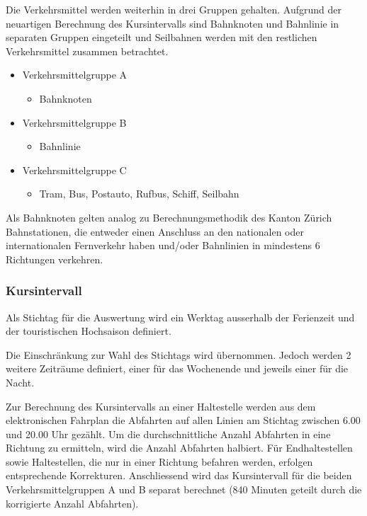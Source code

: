 Die Verkehrsmittel werden weiterhin in drei Gruppen gehalten.
Aufgrund der neuartigen Berechnung des Kursintervalls sind Bahnknoten und Bahnlinie in separaten Gruppen eingeteilt und Seilbahnen werden mit den restlichen Verkehrsmittel zusammen betrachtet.

\begin{itemize}[noitemsep]
    \item Verkehrsmittelgruppe A
    \begin{itemize}
        \item Bahnknoten
    \end{itemize}
    \item Verkehrsmittelgruppe B
    \begin{itemize}
        \item Bahnlinie
    \end{itemize}
    \item Verkehrsmittelgruppe C
    \begin{itemize}
        \item Tram, Bus, Postauto, Rufbus, Schiff, Seilbahn
    \end{itemize}
\end{itemize}

Als Bahnknoten gelten analog zu Berechnungsmethodik des Kanton Zürich Bahnstationen, die entweder einen Anschluss an den nationalen oder internationalen Fernverkehr haben und/oder Bahnlinien in mindestens 6 Richtungen verkehren. 

\subsubsection{Kursintervall}
\label{Zusammenhang zur Berechnungsmethodik ARE:Kursintervall}

\begin{itquote}
Als Stichtag für die Auswertung wird ein Werktag ausserhalb der Ferienzeit und der touristischen Hochsaison definiert.
\end{itquote}

Die Einschränkung zur Wahl des Stichtags wird übernommen.
Jedoch werden 2 weitere Zeiträume definiert, einer für das Wochenende und jeweils einer für die Nacht.

\begin{itquote}
Zur Berechnung des Kursintervalls an einer Haltestelle werden aus dem elektronischen Fahrplan die Abfahrten auf allen Linien am Stichtag zwischen 6.00 und 20.00 Uhr gezählt.
Um die durchschnittliche Anzahl Abfahrten in eine Richtung zu ermitteln, wird die Anzahl Abfahrten halbiert.
Für Endhaltestellen sowie Haltestellen, die nur in einer Richtung befahren werden, erfolgen entsprechende Korrekturen.
Anschliessend wird das Kursintervall für die beiden Verkehrsmittelgruppen A und B separat berechnet (840 Minuten geteilt durch die korrigierte Anzahl Abfahrten).
\end{itquote}


